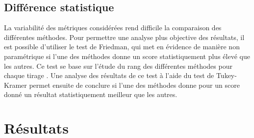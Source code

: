 \documentclass{gretsi}
\newcommand{\set}[1]{\left \{ 1, \dots, #1 \right \}}
\begin{document}

\subsection{Différence statistique}
\label{sub:ds}

La variabilité des métriques considérées rend difficile la comparaison des différentes méthodes. Pour permettre une analyse plus objective des résultats, il est possible d'utiliser le test de Friedman, qui met en évidence de manière non paramétrique si l'une des méthodes donne un score statistiquement plus élevé que les autres. Ce test se base sur l'étude du rang des différentes méthodes pour chaque tirage \cite{friedman_37_rank}. Une analyse des résultats de ce test à l'aide du test de Tukey-Kramer permet ensuite de conclure si l'une des méthodes donne pour un score donné un résultat statistiquement meilleur que les autres.
    


    
       

\section{Résultats}
\label{sec:res}
\end{document}
